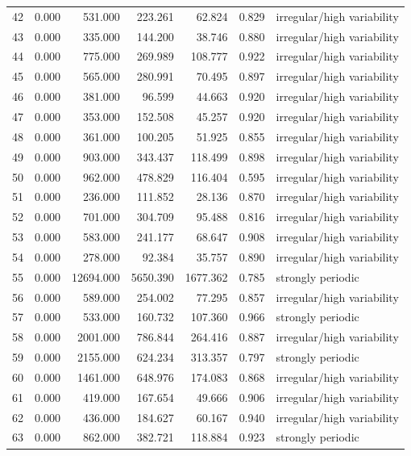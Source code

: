 \begin{longtable}{lrrrrrl}
42 & 0.000 & 531.000 & 223.261 & 62.824 & 0.829 & irregular/high variability \\
43 & 0.000 & 335.000 & 144.200 & 38.746 & 0.880 & irregular/high variability \\
44 & 0.000 & 775.000 & 269.989 & 108.777 & 0.922 & irregular/high variability \\
45 & 0.000 & 565.000 & 280.991 & 70.495 & 0.897 & irregular/high variability \\
46 & 0.000 & 381.000 & 96.599 & 44.663 & 0.920 & irregular/high variability \\
47 & 0.000 & 353.000 & 152.508 & 45.257 & 0.920 & irregular/high variability \\
48 & 0.000 & 361.000 & 100.205 & 51.925 & 0.855 & irregular/high variability \\
49 & 0.000 & 903.000 & 343.437 & 118.499 & 0.898 & irregular/high variability \\
50 & 0.000 & 962.000 & 478.829 & 116.404 & 0.595 & irregular/high variability \\
51 & 0.000 & 236.000 & 111.852 & 28.136 & 0.870 & irregular/high variability \\
52 & 0.000 & 701.000 & 304.709 & 95.488 & 0.816 & irregular/high variability \\
53 & 0.000 & 583.000 & 241.177 & 68.647 & 0.908 & irregular/high variability \\
54 & 0.000 & 278.000 & 92.384 & 35.757 & 0.890 & irregular/high variability \\
55 & 0.000 & 12694.000 & 5650.390 & 1677.362 & 0.785 & strongly periodic \\
56 & 0.000 & 589.000 & 254.002 & 77.295 & 0.857 & irregular/high variability \\
57 & 0.000 & 533.000 & 160.732 & 107.360 & 0.966 & strongly periodic \\
58 & 0.000 & 2001.000 & 786.844 & 264.416 & 0.887 & irregular/high variability \\
59 & 0.000 & 2155.000 & 624.234 & 313.357 & 0.797 & strongly periodic \\
60 & 0.000 & 1461.000 & 648.976 & 174.083 & 0.868 & irregular/high variability \\
61 & 0.000 & 419.000 & 167.654 & 49.666 & 0.906 & irregular/high variability \\
62 & 0.000 & 436.000 & 184.627 & 60.167 & 0.940 & irregular/high variability \\
63 & 0.000 & 862.000 & 382.721 & 118.884 & 0.923 & strongly periodic \\

\end{longtable}
